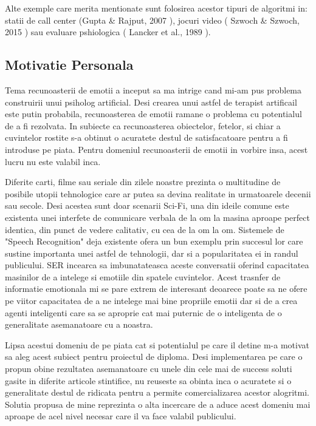 \documentclass[a4paper,12pt]{book}
\begin{document}
					Alte exemple care merita mentionate sunt folosirea acestor tipuri de algoritmi in: statii de call center (Gupta \& Rajput, 2007 \cite{gupta}), jocuri video ( Szwoch \& Szwoch, 2015 \cite{szwoch}) sau evaluare pshiologica ( Lancker et al., 1989 \cite{lancker} ). \par 								
			\subsection{Motivatie Personala}				
					Tema recunoasterii de emotii a inceput sa ma intrige cand mi-am pus problema construirii unui psiholog artificial. Desi crearea unui astfel de terapist artificail este putin probabila, recunoasterea de emotii ramane o problema cu potentialul de a fi rezolvata. In subiecte ca recunoasterea obiectelor, fetelor, si chiar a cuvintelor rostite s-a obtinut o acuratete destul de satisfacatoare pentru a fi introduse pe piata. Pentru domeniul recunoasterii de emotii in vorbire insa, acest lucru nu este valabil inca. \par
					
					Diferite carti, filme sau seriale din zilele noastre prezinta o multitudine de posibile utopii tehnologice care ar putea sa devina realitate in urmatoarele decenii sau secole. Desi acestea sunt doar scenarii Sci-Fi, una din ideile comune este existenta unei interfete de comunicare verbala de la om la masina aproape perfect identica, din punct de vedere calitativ, cu cea de la om la om. Sistemele de "Speech Recognition" deja existente ofera un bun exemplu prin succesul lor care sustine importanta unei astfel de tehnologii, dar si a popularitatea ei in randul publicului. SER incearca sa imbunatateasca aceste conversatii oferind capacitatea masinilor de a intelege si emotiile din spatele cuvintelor. Acest trasnfer de informatie emotionala mi se pare extrem de interesant deoarece poate sa ne ofere pe viitor capacitatea de a ne intelege mai bine propriile emotii dar si de a crea agenti inteligenti care sa se aproprie cat mai puternic de o inteligenta de o generalitate asemanatoare cu a noastra. \par
					
					Lipsa acestui domeniu de pe piata cat si potentialul pe care il detine m-a motivat sa aleg acest subiect pentru proiectul de diploma. Desi implementarea pe care o propun obine rezultatea asemanatoare cu unele din cele mai de success soluti gasite in diferite articole stintifice, nu reuseste sa obinta inca o acuratete si o  generalitate destul de ridicata pentru a permite comercializarea acestor alogritmi. Solutia propusa de mine reprezinta o alta incercare de a aduce acest domeniu mai aproape de acel nivel necesar care il va face valabil publicului. \par 
										
\end{document}
